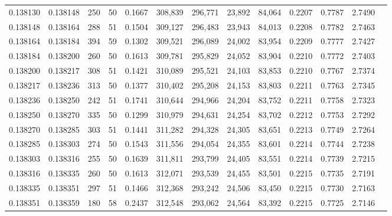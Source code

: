 \begin{tabular}{rrrrrrrrrrrrr}
0.138130 & 0.138148 &   250 &  50 &                                     0.1667 & 308,839 & 296,771 &  23,892 &  84,064 & 0.2207 & 0.7787 & 2.7490 \\
0.138148 & 0.138164 &   288 &  51 &                                     0.1504 & 309,127 & 296,483 &  23,943 &  84,013 & 0.2208 & 0.7782 & 2.7463 \\
0.138164 & 0.138184 &   394 &  59 &                                     0.1302 & 309,521 & 296,089 &  24,002 &  83,954 & 0.2209 & 0.7777 & 2.7427 \\
0.138184 & 0.138200 &   260 &  50 &                                     0.1613 & 309,781 & 295,829 &  24,052 &  83,904 & 0.2210 & 0.7772 & 2.7403 \\
0.138200 & 0.138217 &   308 &  51 &                                     0.1421 & 310,089 & 295,521 &  24,103 &  83,853 & 0.2210 & 0.7767 & 2.7374 \\
0.138217 & 0.138236 &   313 &  50 &                                     0.1377 & 310,402 & 295,208 &  24,153 &  83,803 & 0.2211 & 0.7763 & 2.7345 \\
0.138236 & 0.138250 &   242 &  51 &                                     0.1741 & 310,644 & 294,966 &  24,204 &  83,752 & 0.2211 & 0.7758 & 2.7323 \\
0.138250 & 0.138270 &   335 &  50 &                                     0.1299 & 310,979 & 294,631 &  24,254 &  83,702 & 0.2212 & 0.7753 & 2.7292 \\
0.138270 & 0.138285 &   303 &  51 &                                     0.1441 & 311,282 & 294,328 &  24,305 &  83,651 & 0.2213 & 0.7749 & 2.7264 \\
0.138285 & 0.138303 &   274 &  50 &                                     0.1543 & 311,556 & 294,054 &  24,355 &  83,601 & 0.2214 & 0.7744 & 2.7238 \\
0.138303 & 0.138316 &   255 &  50 &                                     0.1639 & 311,811 & 293,799 &  24,405 &  83,551 & 0.2214 & 0.7739 & 2.7215 \\
0.138316 & 0.138335 &   260 &  50 &                                     0.1613 & 312,071 & 293,539 &  24,455 &  83,501 & 0.2215 & 0.7735 & 2.7191 \\
0.138335 & 0.138351 &   297 &  51 &                                     0.1466 & 312,368 & 293,242 &  24,506 &  83,450 & 0.2215 & 0.7730 & 2.7163 \\
0.138351 & 0.138359 &   180 &  58 &                                     0.2437 & 312,548 & 293,062 &  24,564 &  83,392 & 0.2215 & 0.7725 & 2.7146 \\

\end{tabular}
